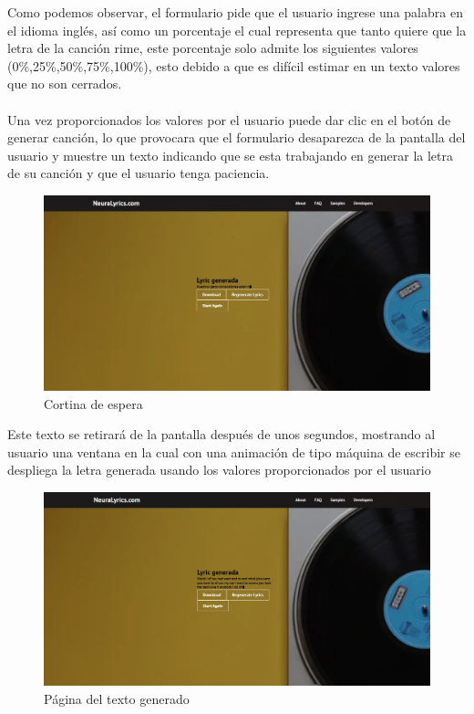 \documentclass[12pt, a4paper, titlepage]{article}
\begin{document}
	Como podemos observar, el formulario pide que el usuario ingrese una palabra en el idioma inglés, así como un porcentaje el cual representa que tanto quiere que la letra de la canción rime, este porcentaje solo admite los siguientes valores (0\%,25\%,50\%,75\%,100\%), esto debido a que es difícil estimar en un texto valores que no son cerrados.\\\\
	Una vez proporcionados los valores por el usuario puede dar clic en el botón de generar canción, lo que provocara que el formulario desaparezca de la pantalla del usuario y muestre un texto indicando que se esta trabajando en generar la letra de su canción y que el usuario tenga paciencia.
	\begin{figure}[H] 
		\includegraphics[width=13.5cm]{./Imagenes/Capturas/pcortina.jpg}
		\centering \caption{Cortina de espera}
	\end{figure}
	Este texto se retirará de la pantalla después de unos segundos, mostrando al usuario una ventana en la cual con una animación de tipo máquina de escribir se despliega la letra generada usando los valores proporcionados por el usuario
	\begin{figure}[H] 
		\includegraphics[width=13.5cm]{./Imagenes/Capturas/ptextogenerado.jpg}
		\centering \caption{Página del texto generado}
	\end{figure}
\end{document}
